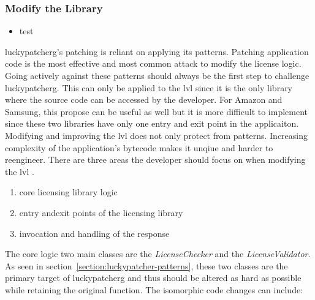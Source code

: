 \subsubsection{Modify the Library} \label{subsection:counter-modifications-library}
\begin{itemize}
    \item test
\end{itemize}
\gls{luckypatcherg}'s patching is reliant on applying its patterns.
Patching application code is the most effective and most common attack to modify the license logic.
Going actively against these patterns should always be the first step to challenge \gls{luckypatcherg}.
This can only be applied to the \gls{lvl} since it is the only library where the source code can be accessed by the developer.
For Amazon and Samsung, this propose can be useful as well but it is more difficult to implement since these two libraries have only one entry and exit point in the applicaiton.
\newline
Modifying and improving the \gls{lvl} does not only protect from patterns.
Increasing complexity of the application's bytecode makes it unqiue and harder to reengineer. \cite{developersSecuring}
\newline
There are three areas the developer should focus on when modifying the \gls{lvl}  \cite{developersSecuring}.
\begin{enumerate}
\item core licensing library logic
\item entry andexit points of the licensing library
\item invocation and handling of the response
\end{enumerate}
The core logic two main classes are the \textit{LicenseChecker} and the \textit{LicenseValidator}.
As seen in section~\ref{section:luckypatcher-patterns}, these two classes are the primary target of \gls{luckypatcherg} and thus should be altered as hard as possible while retaining the original function.
The isomorphic code changes can include:

